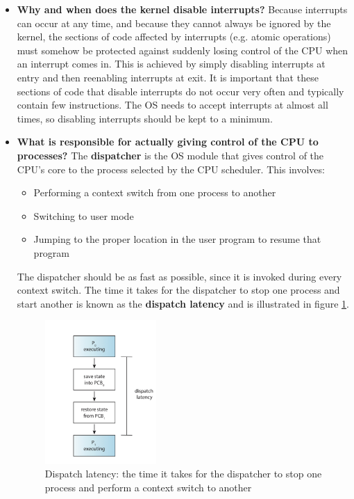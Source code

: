 \documentclass[12pt]{article}
\begin{document}
\begin{itemize}
    \item \textbf{Why and when does the kernel disable interrupts?} Because interrupts can occur at any time, and because they cannot always be ignored by the kernel, the sections of code affected by interrupts (e.g. atomic operations) must somehow be protected against suddenly losing control of the CPU when an interrupt comes in. This is achieved by simply disabling interrupts at entry and then reenabling interrupts at exit. It is important that these sections of code that disable interrupts do not occur very often and typically contain few instructions. The OS needs to accept interrupts at almost all times, so disabling interrupts should be kept to a minimum.
    \item \textbf{What is responsible for actually giving control of the CPU to processes?} The \textbf{dispatcher} is the OS module that gives control of the CPU's core to the process selected by the CPU scheduler. This involves:
        \begin{itemize}
            \item Performing a context switch from one process to another
            \item Switching to user mode
            \item Jumping to the proper location in the user program to resume that program
        \end{itemize}
        The dispatcher should be as fast as possible, since it is invoked during every context switch. The time it takes for the dispatcher to stop one process and start another is known as the \textbf{dispatch latency} and is illustrated in figure \ref{fig:dispatch-latency}.
        \begin{figure}[ht]
            \centering
            \includegraphics[width=0.4\textwidth]{figures/dispatch-latency.jpg}
            \caption{Dispatch latency: the time it takes for the dispatcher to stop one process and perform a context switch to another}
            \label{fig:dispatch-latency}
        \end{figure}
\end{itemize}
\end{document}
